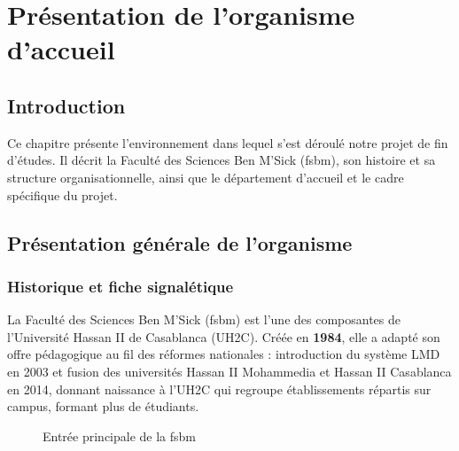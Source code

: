 \newpage
\section{Présentation de l'organisme d'accueil}
\label{ch1}

\subsection{Introduction}
\label{ch1:intro}

Ce chapitre présente l'environnement dans lequel s'est déroulé notre projet de fin d'études. Il décrit la Faculté des Sciences Ben M'Sick (\acrshort{fsbm}), son histoire et sa structure organisationnelle, ainsi que le département d'accueil et le cadre spécifique du projet.

\subsection{Présentation générale de l'organisme}
\label{ch1:presentation}

\subsubsection{Historique et fiche signalétique}
\label{ch1:historique}

La Faculté des Sciences Ben M'Sick (\acrshort{fsbm}) est l'une des composantes de l'Université Hassan II de Casablanca (UH2C). Créée en \textbf{1984}, elle a adapté son offre pédagogique au fil des réformes nationales : introduction du système LMD en 2003 et fusion des universités Hassan II Mohammedia et Hassan II Casablanca en 2014, donnant naissance à l'UH2C qui regroupe  établissements répartis sur  campus, formant plus de  étudiants.

\begin{figure}[H]
    \centering
    \caption{Entrée principale de la \acrshort{fsbm}}
    \label{fig:fsbm_entree}
\end{figure}

